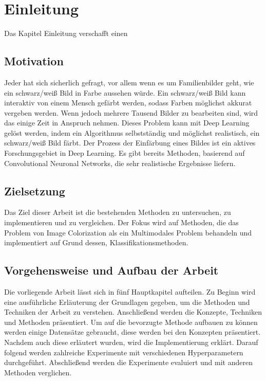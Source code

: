 \chapter{Einleitung}
Das Kapitel Einleitung verschafft einen

\section{Motivation}
Jeder hat sich sicherlich gefragt, vor allem wenn es um Familienbilder geht, wie
ein schwarz/weiß Bild in Farbe aussehen würde. Ein schwarz/weiß Bild kann
interaktiv von einem Mensch gefärbt werden, sodass Farben möglichst akkurat
vergeben werden. Wenn jedoch mehrere Tausend Bilder zu bearbeiten sind, wird das einige
Zeit in Anspruch nehmen. Dieses Problem kann mit Deep Learning gelöst werden, indem
ein Algorithmus selbstständig und möglichst realistisch, ein schwarz/weiß Bild
färbt. Der Prozess der Einfärbung eines Bildes ist ein aktives Forschungsgebiet
in Deep Learning. Es gibt bereits Methoden, basierend auf Convolutional
Neuronal Networks, die sehr realistische Ergebnisse liefern.

\section{Zielsetzung}
Das Ziel dieser Arbeit ist die bestehenden Methoden zu untersuchen, zu implementieren und zu vergleichen. Der Fokus wird
auf Methoden, die das Problem von Image Colorization als ein Multimodales Problem behandeln und implementiert auf Grund dessen, 
Klassifikationsmethoden.

\section{Vorgehensweise und Aufbau der Arbeit}
Die vorliegende Arbeit lässt sich in fünf Hauptkapitel aufteilen. Zu Beginn wird eine ausführliche Erläuterung der Grundlagen gegeben,
um die Methoden und Techniken der Arbeit zu verstehen. Anschließend werden die Konzepte, Techniken und Methoden präsentiert.
Um auf die bevorzugte Methode aufbauen zu können werden einige Datensätze gebraucht, diese werden bei den Konzepten präsentiert.
Nachdem auch diese erläutert wurden, wird die Implementierung erklärt. Darauf folgend werden zahlreiche Experimente mit verschiedenen
Hyperparametern durchgeführt. Abschließend werden die Experimente evaluiert und mit anderen Methoden verglichen.